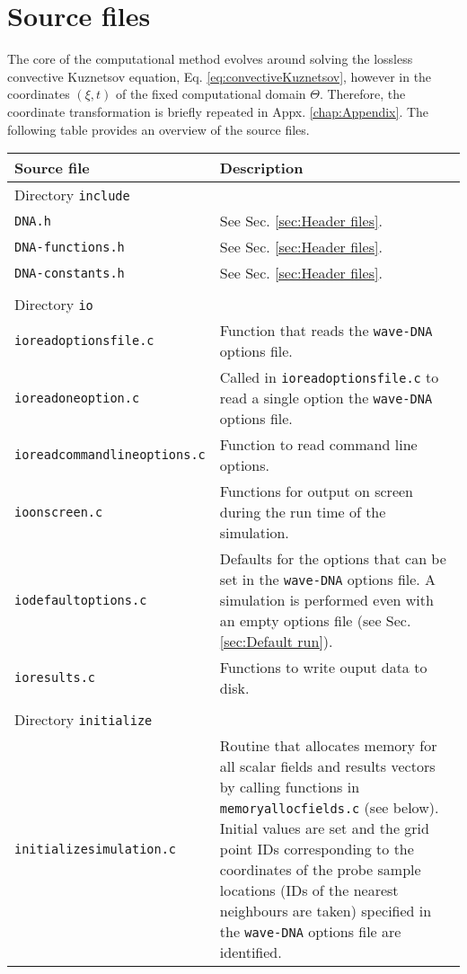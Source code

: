 \section{Source files}
\label{sec:Source files}

The core of the computational method evolves around solving the lossless convective Kuznetsov equation, Eq. \eqref{eq:convectiveKuznetsov}, however in the coordinates $\left(\xi,t\right)$ of the fixed computational domain $\Theta$. Therefore, the coordinate transformation is briefly repeated in Appx. \ref{chap:Appendix}. The following table provides an overview of the source files.

\noindent
\begin{longtable}{p{} p{}}
\textbf{Source file} & \textbf{Description}
\vspace{1mm} \\
\hline Directory {\tt include} &\\ \hline
{\tt DNA.h} & See Sec. \ref{sec:Header files}. \\
{\tt DNA-functions.h} & See Sec. \ref{sec:Header files}. \\
{\tt DNA-constants.h} & See Sec. \ref{sec:Header files}. \\
\\
\hline Directory {\tt io} &\\ \hline
{\tt ioreadoptionsfile.c} & Function that reads the {\tt wave-DNA} options file. \\
{\tt ioreadoneoption.c} & Called in {\tt ioreadoptionsfile.c} to read a single option the {\tt wave-DNA} options file. \\
{\tt ioreadcommandlineoptions.c} & Function to read command line options. \\
{\tt ioonscreen.c} & Functions for output on screen during the run time of the simulation. \\
{\tt iodefaultoptions.c} & Defaults for the options that can be set in the {\tt wave-DNA} options file. A simulation is performed even with an empty options file (see Sec. \ref{sec:Default run}). \\
{\tt ioresults.c} & Functions to write ouput data to disk. \\
\\
\hline Directory {\tt initialize} &\\ \hline
{\tt initializesimulation.c} & Routine that allocates memory for all scalar fields and results vectors by calling functions in {\tt memoryallocfields.c} (see below). Initial values are set and the grid point IDs corresponding to the coordinates of the probe sample locations (IDs of the nearest neighbours are taken) specified in the {\tt wave-DNA} options file are identified. \\

\end{longtable}
